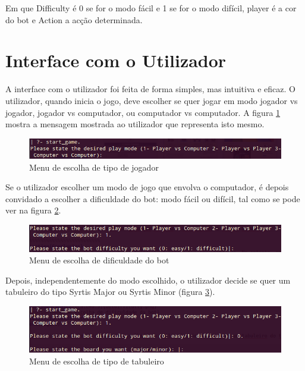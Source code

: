\documentclass[a4paper]{article}
\begin{document}
Em que Difficulty é 0 se for o modo fácil e 1 se for o modo difícil, player é a cor do bot e Action a acção determinada.

\section{Interface com o Utilizador}

A interface com o utilizador foi feita de forma simples, mas intuitiva e eficaz. O utilizador, quando inicia o jogo, deve escolher se quer jogar em modo jogador vs jogador, jogador vs computador, ou computador vs computador. A figura \ref{fig:startgame} mostra a mensagem mostrada ao utilizador que representa isto mesmo.

\begin{figure}[h]
\centering
\includegraphics[scale=0.5]{startgame.png}
\caption{Menu de escolha de tipo de jogador}
\label{fig:startgame}
\end{figure}

Se o utilizador escolher um modo de jogo que envolva o computador, é depois convidado a escolher a dificuldade do bot: modo fácil ou difícil, tal como se pode ver na figura \ref{fig:botdifficulty}.

\begin{figure}[h]
\centering
\includegraphics[scale=0.5]{botdifficulty.png}
\caption{Menu de escolha de dificuldade do bot}
\label{fig:botdifficulty}
\end{figure}

Depois, independentemente do modo escolhido, o utilizador decide se quer um tabuleiro do tipo Syrtis Major ou Syrtis Minor (figura \ref{fig:pickboard}).

\begin{figure}[h]
\centering
\includegraphics[scale=0.5]{pickboard.png}
\caption{Menu de escolha de tipo de tabuleiro}
\label{fig:pickboard}
\end{figure}
\end{document}
